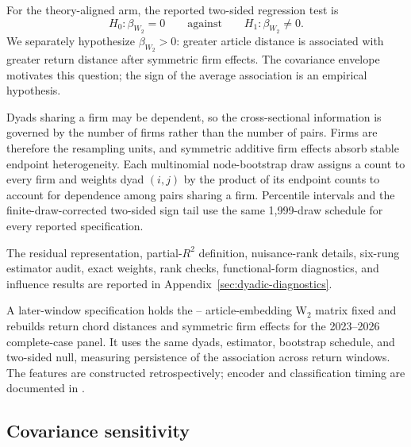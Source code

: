 \begin{hypothesis}
  \label{hyp:monotonicity}
  For the theory-aligned arm, the reported two-sided regression test is
  \begin{equation}\label{eq:dyadic-association-hypothesis}
    H_0:\beta_{W_2}=0
    \qquad\text{against}\qquad
    H_1:\beta_{W_2}\ne0.
  \end{equation}
  We separately hypothesize $\beta_{W_2}>0$: greater article distance is
  associated with greater return distance after symmetric firm effects.
  The covariance envelope motivates this question; the sign of the average
  association is an empirical hypothesis.
\end{hypothesis}

Dyads sharing a firm may be dependent, so the cross-sectional information is
governed by the number of firms rather than the number of pairs.
Firms are therefore the resampling units, and symmetric additive firm effects
absorb stable endpoint heterogeneity.
Each multinomial node-bootstrap draw assigns a count to every firm and
weights dyad $(i,j)$ by the product of its endpoint counts to account for
dependence among pairs sharing a firm.
Percentile intervals and the finite-draw-corrected two-sided sign tail use
the same 1,999-draw schedule for every reported specification.

The residual representation, partial-$R^2$ definition, nuisance-rank details,
six-rung estimator audit, exact weights, rank checks, functional-form
diagnostics, and influence results are reported in
Appendix~\ref{sec:dyadic-diagnostics}.

A later-window specification holds the
-- article-embedding
W$_2$ matrix fixed and rebuilds return chord distances and symmetric firm
effects for the 2023--2026 complete-case panel.
It uses the same dyads, estimator, bootstrap schedule, and two-sided null,
measuring persistence of the association across return windows.
The features are constructed retrospectively; encoder and classification
timing are documented in .

\subsection{Covariance sensitivity}\label{sec:covariance-sensitivity}

